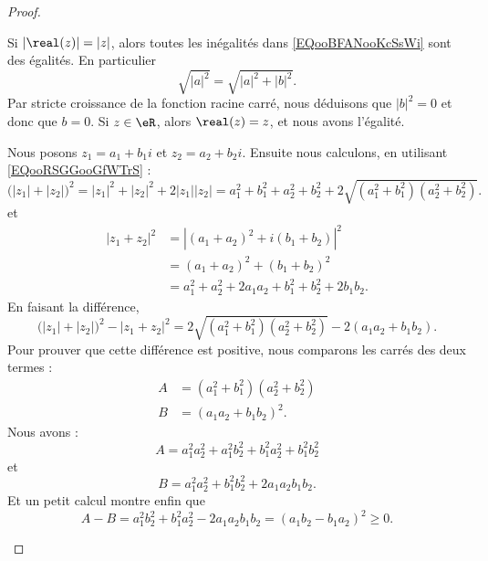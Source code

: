 \begin{proof}
\begin{subproof}
\begin{subproof}
			Si \( | \real(z) |=| z |\), alors toutes les inégalités dans \eqref{EQooBFANooKcSsWi} sont des égalités. En particulier
			\begin{equation}
				\sqrt{ | a |^2 }=\sqrt{ | a |^2+| b |^2 }.
			\end{equation}
			Par stricte croissance de la fonction racine carré, nous déduisons que \( | b |^2=0\) et donc que \( b=0\).
			Si \( z\in \eR\), alors \( \real(z)=z\), et nous avons l'égalité.
		\end{subproof}
		Nous posons \( z_1=a_1+b_1i\) et \( z_2=a_2+b_2i\). Ensuite nous calculons, en utilisant \eqref{EQooRSGGooGfWTrS} :
		\begin{equation}
			\big( | z_1 |+| z_2 | \big)^2=| z_1 |^2+| z_2 |^2+2| z_1 | |z_2 |=a_1^2+b_1^2+a_2^2+b_2^2+2\sqrt{ (a_1^2+b_1^2)(a_2^2+b_2^2) }.
		\end{equation}
		et
		\begin{subequations}
			\begin{align}
				| z_1+z_2 |^2 & =| (a_1+a_2)^2+i(b_1+b_2) |^2             \\
				              & =(a_1+a_2)^2+(b_1+b_2)^2                  \\
				              & =a_1^2+a_2^2+2a_1a_2+b_1^2+b_2^2+2b_1b_2.
			\end{align}
		\end{subequations}
		En faisant la différence,
		\begin{equation}
			\big( | z_1 |+|z_2| \big)^2-| z_1+z_2 |^2=2\sqrt{ (a_1^2+b_1^2)(a_2^2+b_2^2) }-2(a_1a_2+b_1b_2).
		\end{equation}
		Pour prouver que cette différence est positive, nous comparons les carrés des deux termes :
		\begin{subequations}
			\begin{align}
				A & =(a_1^2+b_1^2)(a_2^2+b_2^2) \\
				B & =(a_1a_2+b_1b_2)^2.
			\end{align}
		\end{subequations}
		Nous avons :
		\begin{equation}
			A=a_1^2a_2^2+a_1^2b_2^2+b_1^2a_2^2+b_1^2b_2^2
		\end{equation}
		et
		\begin{equation}
			B=a_1^2a_2^2+b_1^2b_2^2+2a_1a_2b_1b_2.
		\end{equation}
		Et un petit calcul montre enfin que
		\begin{equation}
			A-B=a_1^2b_2^2+b_1^2a_2^2-2a_1a_2b_1b_2=(a_1b_2-b_1a_2)^2\geq 0.
		\end{equation}
	\end{subproof}
\end{proof}

